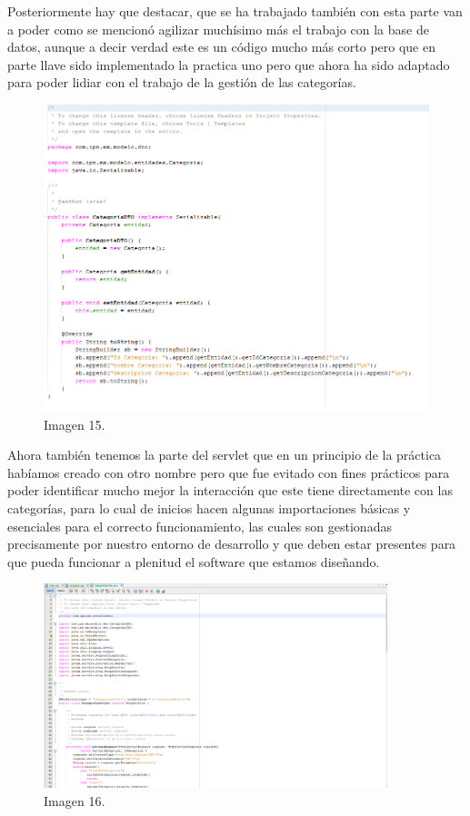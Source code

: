 \documentclass[10pt,a4paper]{article}
\begin{document}
\vspace{60mm}

Posteriormente hay que destacar, que se ha trabajado también con esta parte van a poder como se mencionó agilizar muchísimo más el trabajo con la base de datos, aunque a decir verdad este es un código mucho más corto pero que en parte llave sido implementado la practica uno pero que ahora ha sido adaptado para poder lidiar con el trabajo de la gestión de las categorías.

\begin{figure}[h]
\centering
\includegraphics[width=12cm]{categoriaDTO}
\caption{Imagen 15.}
\label{fig:figure1}
\end{figure}

Ahora también tenemos la parte del servlet que en un principio de la práctica habíamos creado con otro nombre pero que fue evitado con fines prácticos para poder identificar mucho mejor la interacción que este tiene directamente con las categorías, para lo cual de inicios hacen algunas importaciones básicas y esenciales para el correcto funcionamiento, las cuales son gestionadas precisamente por nuestro entorno de desarrollo y que deben estar presentes para que pueda funcionar a plenitud el software que estamos diseñando.
\begin{figure}[h]
\centering
\includegraphics[width=10cm]{categoriaServlet1}
\caption{Imagen 16.}
\label{fig:figure1}
\end{figure}
\end{document}
